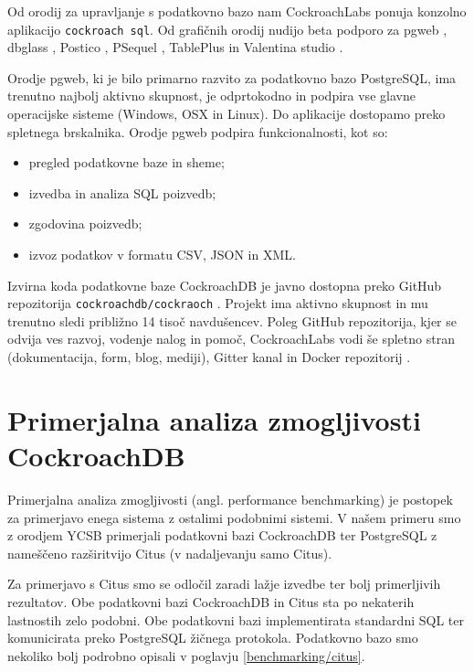 \documentclass[a4paper, 12pt]{book}
\begin{document}
Od orodij za upravljanje s podatkovno bazo nam CockroachLabs ponuja konzolno aplikacijo \texttt{cockroach sql}. Od grafičnih orodij nudijo beta podporo \cite{CRDB-meta-vizualizers} za pgweb \cite{pgweb-home}, dbglass \cite{dbglass-home}, Postico \cite{postico-home}, PSequel \cite{psequel-home}, TablePlus \cite{tableplus-home} in Valentina studio \cite{valentinastudio-home}.

Orodje pgweb, ki je bilo primarno razvito za podatkovno bazo PostgreSQL, ima trenutno najbolj aktivno skupnost, je odprtokodno in podpira vse glavne operacijske sisteme (Windows, OSX in Linux). Do aplikacije dostopamo preko spletnega brskalnika. Orodje pgweb podpira funkcionalnosti, kot so:

\begin{itemize}
    \item pregled podatkovne baze in sheme;
    \item izvedba in analiza SQL poizvedb;
    \item zgodovina poizvedb;
    \item izvoz podatkov v formatu CSV, JSON in XML.
\end{itemize}

Izvirna koda podatkovne baze CockroachDB je javno dostopna preko GitHub repozitorija \texttt{cockroachdb/cockraoch} \cite{cockroachdb/cockroach}. Projekt ima aktivno skupnost in mu trenutno sledi približno 14 tisoč navdušencev. Poleg GitHub repozitorija, kjer se odvija ves razvoj, vodenje nalog in pomoč, CockroachLabs vodi še spletno stran \cite{CRDB-home} (dokumentacija, form, blog, mediji), Gitter kanal \cite{CRDB-gitter} in Docker repozitorij \cite{CRDB-docker}.

\chapter{Primerjalna analiza zmogljivosti CockroachDB}

Primerjalna analiza zmogljivosti (angl. performance benchmarking) je postopek za primerjavo enega sistema z ostalimi podobnimi sistemi. V našem primeru smo z orodjem YCSB primerjali podatkovni bazi CockroachDB ter PostgreSQL z nameščeno razširitvijo Citus (v nadaljevanju samo Citus). 

Za primerjavo s Citus smo se odločil zaradi lažje izvedbe ter bolj primerljivih rezultatov. Obe podatkovni bazi CockroachDB in Citus sta po nekaterih lastnostih zelo podobni. Obe podatkovni bazi implementirata standardni SQL ter komunicirata preko PostgreSQL žičnega protokola. Podatkovno bazo smo nekoliko bolj podrobno opisali v poglavju \ref{benchmarking/citus}.
\end{document}
